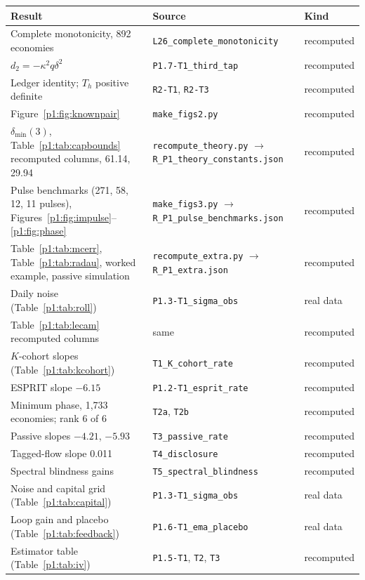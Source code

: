 \begin{longtable}{p{}p{}p{}}
\toprule
Result & Source & Kind\\
\midrule
\endhead
Complete monotonicity, 892 economies & \texttt{L26\_complete\_monotonicity} & recomputed\\
$d_2=-\kappa^2q\delta^2$ & \texttt{P1.7-T1\_third\_tap} & recomputed\\
Ledger identity; $T_h$ positive definite & \texttt{R2-T1}, \texttt{R2-T3} & recomputed\\
Figure~\ref{p1:fig:knownpair} & \texttt{make\_figs2.py} & recomputed\\
$\delta_{\min}(3)$, Table~\ref{p1:tab:capbounds} recomputed columns, 61.14, 29.94 & \texttt{recompute\_theory.py} $\to$ \texttt{R\_P1\_theory\_constants.json} & recomputed\\
Pulse benchmarks (271, 58, 12, 11 pulses), Figures~\ref{p1:fig:impulse}--\ref{p1:fig:phase} & \texttt{make\_figs3.py} $\to$ \texttt{R\_P1\_pulse\_benchmarks.json} & recomputed\\
Table~\ref{p1:tab:mcerr}, Table~\ref{p1:tab:radau}, worked example, passive simulation & \texttt{recompute\_extra.py} $\to$ \texttt{R\_P1\_extra.json} & recomputed\\
Daily noise (Table~\ref{p1:tab:roll}) & \texttt{P1.3-T1\_sigma\_obs} & real data\\
Table~\ref{p1:tab:lecam} recomputed columns & same & recomputed\\
$K$-cohort slopes (Table~\ref{p1:tab:kcohort}) & \texttt{T1\_K\_cohort\_rate} & recomputed\\
ESPRIT slope $-6.15$ & \texttt{P1.2-T1\_esprit\_rate} & recomputed\\
Minimum phase, 1,733 economies; rank 6 of 6 & \texttt{T2a}, \texttt{T2b} & recomputed\\
Passive slopes $-4.21$, $-5.93$ & \texttt{T3\_passive\_rate} & recomputed\\
Tagged-flow slope 0.011 & \texttt{T4\_disclosure} & recomputed\\
Spectral blindness gains & \texttt{T5\_spectral\_blindness} & recomputed\\
Noise and capital grid (Table~\ref{p1:tab:capital}) & \texttt{P1.3-T1\_sigma\_obs} & real data\\
Loop gain and placebo (Table~\ref{p1:tab:feedback}) & \texttt{P1.6-T1\_ema\_placebo} & real data\\
Estimator table (Table~\ref{p1:tab:iv}) & \texttt{P1.5-T1}, \texttt{T2}, \texttt{T3} & recomputed\\

\end{longtable}
